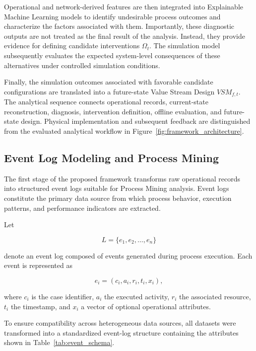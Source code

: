\documentclass[pdflatex,iicol,Numbered,sn-basic]{sn-jnl}
\begin{document}
Operational and network-derived features are then integrated into
Explainable Machine Learning models to identify undesirable process outcomes
and characterize the factors associated with them. Importantly, these
diagnostic outputs are not treated as the final result of the analysis.
Instead, they provide evidence for defining candidate interventions
\(\Omega_t\). The simulation model subsequently evaluates the expected
system-level consequences of these alternatives under controlled simulation
conditions.

Finally, the simulation outcomes associated with favorable candidate
configurations are translated into a future-state Value Stream Design
\(VSM_{f,t}\). The analytical sequence connects operational records, current-state reconstruction, diagnosis, intervention definition, offline evaluation, and future-state design. Physical implementation and subsequent feedback are distinguished from the evaluated analytical workflow in Figure~\ref{fig:framework_architecture}.

\subsection{Event Log Modeling and Process Mining}

The first stage of the proposed framework transforms raw operational records into structured event logs suitable for Process Mining analysis. Event logs constitute the primary data source from which process behavior, execution patterns, and performance indicators are extracted.

Let

\[
L=\{e_1,e_2,\ldots,e_n\}
\]

denote an event log composed of events generated during process execution. Each event is represented as

\[
e_i=(c_i,a_i,r_i,t_i,x_i),
\]

where \(c_i\) is the case identifier, \(a_i\) the executed activity, \(r_i\) the associated resource, \(t_i\) the timestamp, and \(x_i\) a vector of optional operational attributes.

To ensure compatibility across heterogeneous data sources, all datasets were transformed into a standardized event-log structure containing the attributes shown in Table~\ref{tab:event_schema}.
\end{document}
